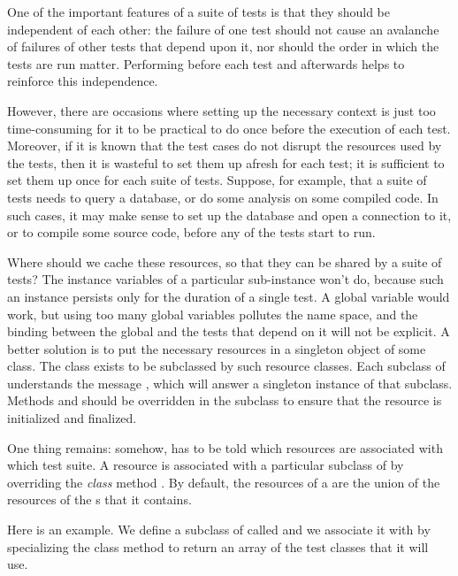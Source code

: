 \documentclass[a4paper,10pt,twoside]{book}
\begin{document}
One of the important  features of a suite of tests is that they should be independent of each other: the failure of one test should not cause an avalanche of failures of other tests that depend upon it, nor should the order in which the tests are run matter.
Performing  before each test and  afterwards helps to reinforce this independence. 

However, there are occasions where setting up the necessary context is just too time-consuming for it to be practical to do once before the execution of each test.
Moreover, if it is known that the test cases do not disrupt the resources used by the tests, then it is wasteful to set them up afresh for each test; it is sufficient to set them up once for each suite of tests.
Suppose, for example, that a suite of tests needs to query a database, or do some analysis on some compiled code.
In such cases, it may make sense to set up the database and open a connection to it, or to compile some source code, before any of the tests start to run.

Where should we cache these resources, so that they can be shared by a suite of tests?
The instance variables of a particular  sub-instance won't do, because such an instance persists only for the duration of a single test.
A global variable would work, but using too many global variables pollutes the name space, and the binding between the global and the tests that depend on it will not be explicit.
A better solution is to put the necessary resources in a singleton object of some class.
The class  exists to be subclassed by such resource classes.
Each subclass of  understands the message  , which will answer a singleton instance of that subclass.
Methods  and  should be overridden in the subclass to ensure that the resource is initialized and finalized.

One thing remains: somehow, \sunit has to be told which resources are associated with which test suite.
A resource is associated
with a particular subclass of  
by overriding the \emph{class} method .
By default, the resources of 
a  are
the union of the resources of
the s that it contains.

Here is an example. 
We define a subclass of  called
 and we associate it with 
by specializing the class method  to return an array
of the test classes that it will use.
\end{document}
